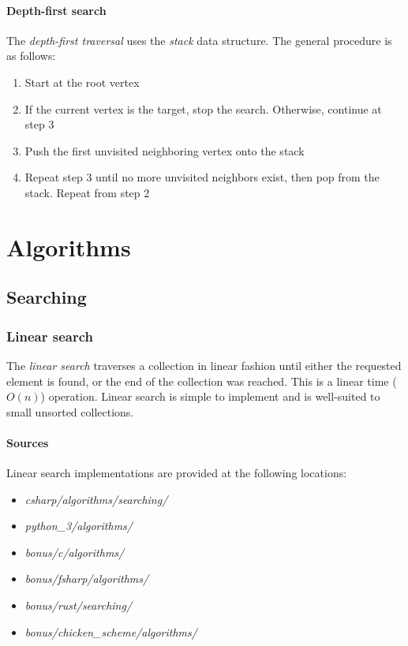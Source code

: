 \documentclass{article}
\begin{document}

\paragraph{Depth-first search}
The {\em depth-first traversal} uses the {\em stack} data structure. The general procedure is as follows:
\begin{enumerate}
\item{Start at the root vertex}
\item{If the current vertex is the target, stop the search. Otherwise, continue at step 3}
\item{Push the first unvisited neighboring vertex onto the stack}
\item{Repeat step 3 until no more unvisited neighbors exist, then pop from the stack. Repeat from step 2}
\end{enumerate}



\newpage


\section{Algorithms}
\subsection{Searching}
\subsubsection{Linear search}
The {\em linear search} traverses a collection in linear fashion until either the requested element is found,
or the end of the collection was reached. This is a linear time (\(O(n)\)) operation.
Linear search is simple to implement and is well-suited to small unsorted collections.

\paragraph{Sources}
Linear search implementations are provided at the following locations:
\begin{itemize}
\item{{\em csharp/algorithms/searching/}}
\item{{\em python\_3/algorithms/}}
\item{{\em bonus/c/algorithms/}}
\item{{\em bonus/fsharp/algorithms/}}
\item{{\em bonus/rust/searching/}}
\item{{\em bonus/chicken\_scheme/algorithms/}}
\end{itemize}
\end{document}

